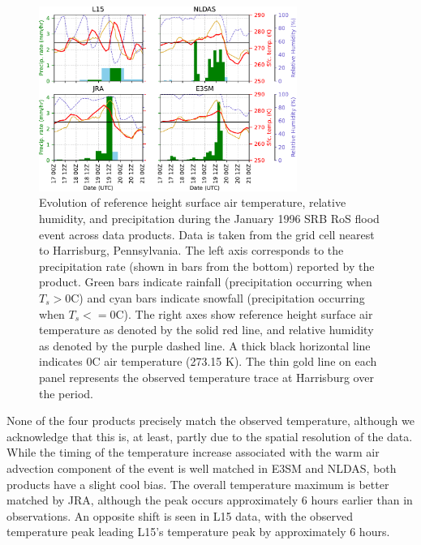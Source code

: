 \documentclass[nhess, manuscript]{copernicus}
\begin{document}
\begin{figure}
\noindent\includegraphics[width=0.75\textwidth]{figs/cropped/precip_vs_t_1996.pdf}
\caption{Evolution of reference height surface air temperature, relative humidity, and precipitation during the January 1996 SRB RoS flood event across data products. Data is taken from the grid cell nearest to Harrisburg, Pennsylvania. The left axis corresponds to the precipitation rate (shown in bars from the bottom) reported by the product. Green bars indicate rainfall (precipitation occurring when $T_s > 0$\degree{}C) and cyan bars indicate snowfall (precipitation occurring when $T_s <= 0$\degree{}C). The right axes show reference height surface air temperature as denoted by the solid red line, and relative humidity as denoted by the purple dashed line. A thick black horizontal line indicates 0\degree{}C air temperature (273.15 K). The thin gold line on each panel represents the observed temperature trace at Harrisburg over the period.}
\label{fig:1996eventtrace}
\end{figure}

None of the four products precisely match the observed temperature, although we acknowledge that this is, at least, partly due to the spatial resolution of the data.
While the timing of the temperature increase associated with the warm air advection component of the event is well matched in E3SM and NLDAS, both products have a slight cool bias.
The overall temperature maximum is better matched by JRA, although the peak occurs approximately 6 hours earlier than in observations. An opposite shift is seen in L15 data, with the observed temperature peak leading L15's temperature peak by approximately 6 hours.
\end{document}
